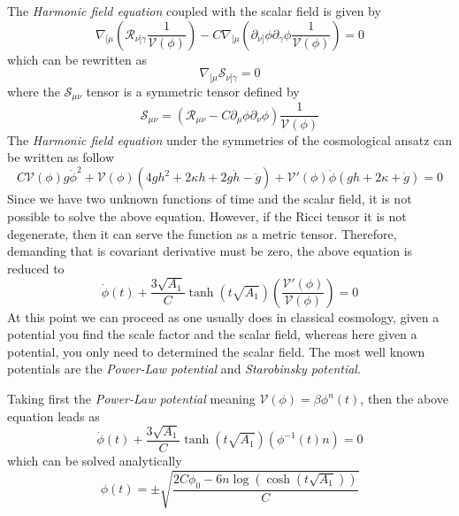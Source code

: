 \documentclass[10pt,a4paper]{article}
\begin{document}
The \textit{Harmonic field equation} coupled with the scalar field is given by
\begin{equation}
  \nabla_{[\mu}\left(\mathcal{R}_{\nu]\gamma}\frac{1}{\mathcal{V}(\phi)}\right) 
  - C \nabla_{[\mu}\left(\partial_{\nu]} \phi \partial_\gamma \phi \frac{1}{\mathcal{V}(\phi)}\right) = 0
\end{equation}
which can be rewritten as
\begin{equation}
  \nabla_{[\mu}\mathcal{S}_{\nu]\gamma} = 0
\end{equation}
where the $\mathcal{S}_{\mu\nu}$ tensor is a symmetric tensor defined by
\begin{equation}
  \mathcal{S}_{\mu\nu} = \left(\mathcal{R}_{\mu\nu} - C \partial_{\mu} \phi \partial_\nu \phi \right)\frac{1}{\mathcal{V}(\phi)}
\end{equation}
The \textit{Harmonic field equation} under the symmetries of the cosmological ansatz can be written as follow
\begin{equation}
  C\mathcal{V}(\phi)g\dot{\phi}^2 + \mathcal{V}(\phi)\left(4gh^2 +2\kappa h + 2g\dot{h} - \ddot{g}\right) +
  \mathcal{V}'(\phi)\dot{\phi}\left(gh + 2\kappa + \dot{g}\right) = 0
\end{equation}
Since we have two unknown functions of time and the scalar field, it is not possible to solve the above equation. However, if the Ricci tensor
it is not degenerate, then it can serve the function as a metric tensor. Therefore, demanding that is covariant derivative must be zero, 
the above equation is reduced to
\begin{equation} 
  \dot{\phi}(t) + \frac{3\sqrt{A_1}}{C}\tanh\left(t\sqrt{A_1}\right)\left(\frac{\mathcal{V}'(\phi)}{\mathcal{V}(\phi)}\right) = 0
\end{equation}
At this point we can proceed as one usually does in classical cosmology, given a potential you find the scale factor and the scalar field, whereas 
here given a potential, you only need to determined the scalar field. The most well known potentials are the \textit{Power-Law potential} and 
\textit{Starobinsky potential}.

Taking first the \textit{Power-Law potential} meaning $\mathcal{V}(\phi) = \beta \phi^n(t)$, then the above equation leads as
\begin{equation}
  \dot{\phi}(t) + \frac{3\sqrt{A_1}}{C}\tanh\left(t\sqrt{A_1}\right)\left(\phi^{-1}(t)n\right) = 0
\end{equation}
which can be solved analytically
\begin{equation}
  \phi(t) = \pm \sqrt{\frac{2C\phi_0 - 6n\log(\cosh(t\sqrt{A_1}))}{C} }
\end{equation}
\end{document}
